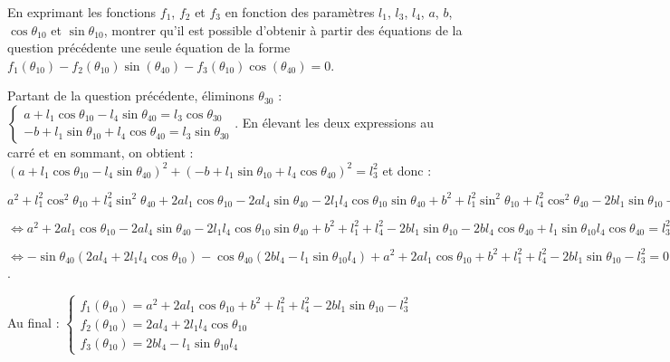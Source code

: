 \documentclass[11pt]{article}
\begin{document}
\UPSTIquestion  En exprimant les fonctions $f_1$, $f_2$ et $f_3$ en fonction des paramètres $l_1$, $l_3$, $l_4$, $a$, $b$, $\cos\theta_{10}$ et $\sin \theta_{10}$, montrer qu’il est possible d’obtenir à partir des équations de la question précédente une seule équation de la forme $f_1\left(\theta_{10}\right) - f_2\left(\theta_{10}\right) \sin \left(\theta_{40}\right) - f_3 \left(\theta_{10}\right) \cos \left(\theta_{40}\right)=0$.

\begin{UPSTIcorrige}
Partant de la question précédente, éliminons $\theta_{30}$ :
$
\left\{ 
\begin{array}{l}
a   +l_1  \cos\theta_{10} -  l_4  \sin\theta_{40}   = l_3 \cos\theta_{30}  \\
- b +l_1  \sin\theta_{10} + l_4  \cos \theta_{40}  = l_3  \sin\theta_{30}   
\end{array}
\right.
$.
En élevant les deux expressions au carré et en sommant, on obtient : 
$\left(a   +l_1  \cos\theta_{10} -  l_4  \sin\theta_{40} \right)^2 + 
\left(- b +l_1  \sin\theta_{10} + l_4  \cos \theta_{40}\right)^2 = l_3^2$ et donc : 

$a^2   +l_1^2  \cos^2\theta_{10} +  l_4^2  \sin^2\theta_{40} 
+ 2al_1\cos\theta_{10} - 2a  l_4  \sin\theta_{40} - 2l_1l_4 \cos\theta_{10}\sin\theta_{40}
+b^2 + l_1^2  \sin^2\theta_{10} + l_4 ^2 \cos^2 \theta_{40}
- 2bl_1  \sin\theta_{10} - 2b l_4  \cos \theta_{40} + l_1  \sin\theta_{10}l_4  \cos \theta_{40}  = l_3^2$ 

$ \Leftrightarrow 
a^2     
+ 2al_1\cos\theta_{10} - 2a  l_4  \sin\theta_{40} - 2l_1l_4 \cos\theta_{10}\sin\theta_{40}
+b^2 + l_1^2  + l_4 ^2 - 2bl_1  \sin\theta_{10} - 2b l_4  \cos \theta_{40} + l_1  \sin\theta_{10}l_4  \cos \theta_{40}  = l_3^2$ 

$ \Leftrightarrow 
-\sin\theta_{40}\left( 2a  l_4  + 2l_1l_4 \cos\theta_{10}\right)  
-\cos \theta_{40}\left( 2b l_4   - l_1  \sin\theta_{10}l_4  \right)
+a^2  + 2al_1\cos\theta_{10}  +b^2 + l_1^2  + l_4 ^2 - 2bl_1  \sin\theta_{10}   - l_3^2 = 0$.

Au final : 
$\left\{
\begin{array}{l}
 f_1\left(\theta_{10}\right) =a^2  + 2al_1\cos\theta_{10}  +b^2 + l_1^2  + l_4 ^2 - 2bl_1  \sin\theta_{10}   - l_3^2  \\
 f_2\left(\theta_{10}\right) =2a  l_4  + 2l_1l_4 \cos\theta_{10} \\
 f_3\left(\theta_{10}\right) = 2b l_4   - l_1  \sin\theta_{10}l_4 
\end{array}
\right.
$


\end{UPSTIcorrige}
\end{document}
